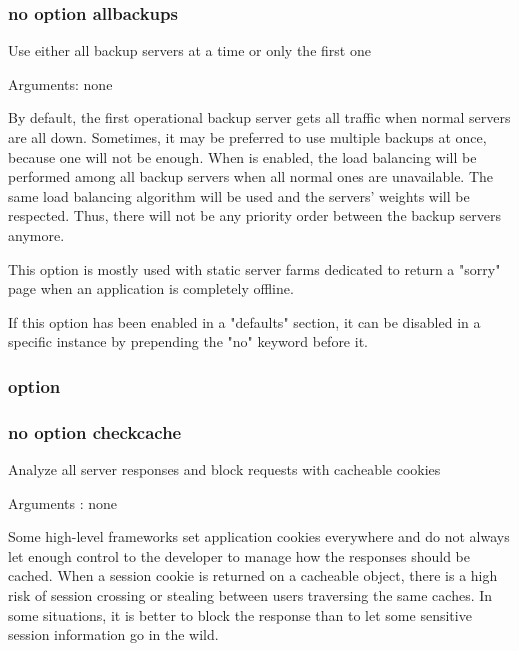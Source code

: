 \subsubsection*{no option allbackups}


  Use either all backup servers at a time or only the first one


  Arguments: none

  By default, the first operational backup server gets all traffic when normal
  servers are all down. Sometimes, it may be preferred to use multiple backups
  at once, because one will not be enough. When  is enabled,
  the load balancing will be performed among all backup servers when all normal
  ones are unavailable. The same load balancing algorithm will be used and the
  servers' weights will be respected. Thus, there will not be any priority
  order between the backup servers anymore.

  This option is mostly used with static server farms dedicated to return a
  "sorry" page when an application is completely offline.

  If this option has been enabled in a "defaults" section, it can be disabled
  in a specific instance by prepending the "no" keyword before it.

\subsubsection[checkcache]{option }
\subsubsection*{no option checkcache}


  Analyze all server responses and block requests with cacheable cookies


  Arguments : none

  Some high-level frameworks set application cookies everywhere and do not
  always let enough control to the developer to manage how the responses should
  be cached. When a session cookie is returned on a cacheable object, there is a
  high risk of session crossing or stealing between users traversing the same
  caches. In some situations, it is better to block the response than to let
  some sensitive session information go in the wild.

